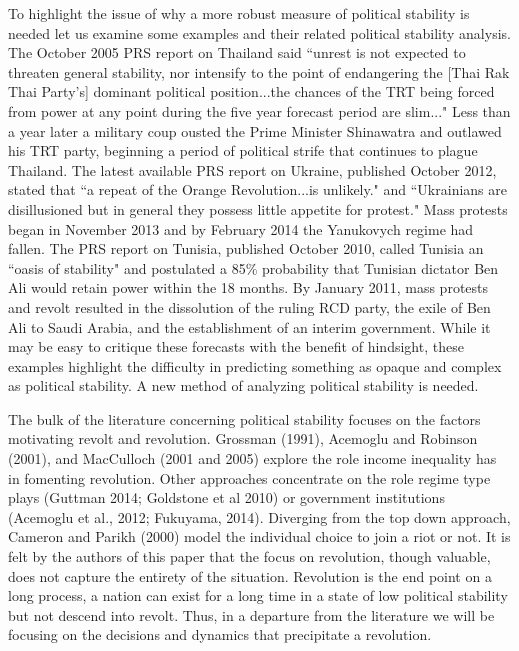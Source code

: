 \documentclass[12pt]{article}
\begin{document}
\begin{spacing}{1.5}
To highlight the issue of why a more robust measure of political stability is needed let us examine some examples and their related political stability analysis. The October 2005 PRS report on Thailand said ``unrest is not expected to threaten general stability, nor intensify to the point of endangering the [Thai Rak Thai Party's] dominant political position...the chances of the TRT being forced from power at any point during the five year forecast period are slim..." Less than a year later a military coup ousted the Prime Minister Shinawatra and outlawed his TRT party, beginning a period of political strife that continues to plague Thailand. The latest available PRS report on Ukraine, published October 2012, stated that ``a repeat of the Orange Revolution...is unlikely." and ``Ukrainians are disillusioned but in general they possess little appetite for protest." Mass protests began in November 2013 and by February 2014 the Yanukovych regime had fallen. The PRS report on Tunisia, published October 2010, called Tunisia an ``oasis of stability" and postulated a 85\% probability that Tunisian dictator Ben Ali would retain power within the 18 months. By January 2011, mass protests and revolt resulted in the dissolution of the ruling RCD party, the exile of Ben Ali to Saudi Arabia, and the establishment of an interim government. While it may be easy to critique these forecasts with the benefit of hindsight, these examples highlight the difficulty in predicting something as opaque and complex as political stability. A new method of analyzing political stability is needed. 

The bulk of the literature concerning political stability focuses on the factors motivating revolt and revolution. Grossman (1991), Acemoglu and Robinson (2001), and MacCulloch (2001 and 2005) explore the role income inequality has in fomenting revolution. Other approaches concentrate on the role regime type plays (Guttman 2014; Goldstone et al 2010) or government institutions (Acemoglu et al., 2012; Fukuyama, 2014). Diverging from the top down approach, Cameron and Parikh (2000) model the individual choice to join a riot or not. It is felt by the authors of this paper that the focus on revolution, though valuable, does not capture the entirety of the situation. Revolution is the end point on a long process, a nation can exist for a long time in a state of low political stability but not descend into revolt. Thus, in a departure from the literature we will be focusing on the decisions and dynamics that precipitate a revolution. 


\end{spacing}
\end{document}
